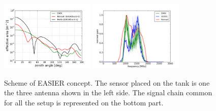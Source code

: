\documentclass{PoS}
\begin{document}
\begin{figure}[h]
\centering
\includegraphics[width=0.4\textwidth]{effectiveareas.png}
\includegraphics[width=0.4\textwidth]{spectra3.png}

\caption{Scheme of EASIER concept. The sensor  placed on the tank is one the three antenna shown in the left side. The signal chain common for all the setup is represented on the bottom part.}
\label{fig:calib}
\end{figure}
\end{document}
